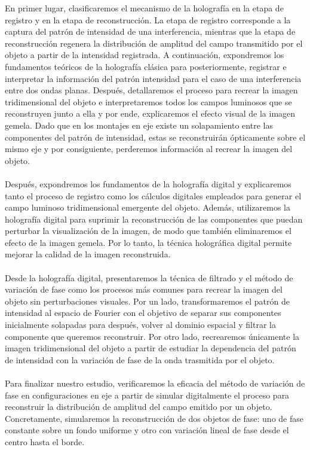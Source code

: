 \documentclass[12pt]{article}
\begin{document}
En primer lugar, clasificaremos el mecanismo de la holografía en la etapa de registro y en la etapa de reconstrucción. La etapa de registro corresponde a la captura del patrón de intensidad  de una interferencia, mientras que la etapa de reconstrucción regenera la distribución de amplitud del campo  transmitido por el objeto a partir de la intensidad registrada. A continuación, expondremos los fundamentos teóricos   de la holografía clásica para posteriormente,  registrar e interpretar la información del patrón intensidad  para el caso de una interferencia entre dos ondas planas. Después,  detallaremos  el proceso para recrear la imagen tridimensional del objeto e interpretaremos todos los campos luminosos que se reconstruyen junto a ella y por ende,  explicaremos el efecto visual de la imagen gemela. Dado que en los montajes en eje existe un solapamiento entre las componentes del patrón de intensidad, estas se reconstruirán ópticamente sobre el mismo eje y por consiguiente, perderemos información al recrear la imagen del objeto.\\ \\
Después, expondremos los fundamentos  de la holografía digital y explicaremos tanto el proceso de registro como los cálculos digitales empleados para generar el campo luminoso tridimensional emergente del objeto. Además, utilizaremos la holografía digital para suprimir  la reconstrucción de las componentes que puedan perturbar la visualización de la imagen, de modo que también eliminaremos el efecto de la imagen gemela. Por lo tanto,  la técnica holográfica digital permite  mejorar  la calidad de la imagen reconstruida. \\ \\
Desde la holografía digital, presentaremos la técnica de filtrado y el método de variación de fase como los procesos más comunes para recrear la imagen del objeto sin perturbaciones visuales. Por un lado, transformaremos  el patrón de intensidad  al espacio de Fourier con el objetivo de  separar sus componentes   inicialmente solapadas para después,  volver al dominio espacial y filtrar la componente  que queremos reconstruir. Por otro lado, recrearemos únicamente la imagen tridimensional del objeto a partir de estudiar  la dependencia del patrón de intensidad con  la variación de fase de la onda trasmitida por el objeto. \\ \\
Para finalizar nuestro estudio, verificaremos la eficacia del método de variación de fase en configuraciones en eje a partir de simular digitalmente el proceso  para reconstruir la distribución de amplitud del campo emitido por un objeto. Concretamente, simularemos la reconstrucción de dos objetos de fase: uno de fase constante sobre un fondo uniforme  y otro con variación lineal de fase desde el centro hasta el borde.
\end{document}
